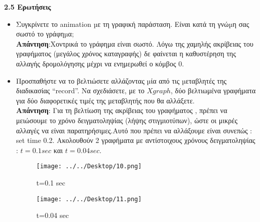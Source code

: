 \documentclass{article}%
\begin{document}
\textbf{2.5 Ερωτήσεις } \\
\begin{itemize}
	\item Συγκρίνετε το \textlatin{animation} µε τη γραφική παράσταση. Είναι κατά τη γνώµη σας σωστό το γράφηµα;\\
	\textbf{Απάντηση}:Χοντρικά το γράφημα είναι σωστό. Λόγω της χαμηλής ακρίβειας του γραφήματος (μεγάλος χρόνος καταγραφής) δε φαίνεται η καθυστέρηση της αλλαγής δρομολόγησης μέχρι να ενημερωθεί ο κόμβος 0.\\
	\item Προσπαθήστε να το βελτιώσετε αλλάζοντας µία από τις µεταβλητές της διαδικασίας “\textlatin{record}”. Να
σχεδιάσετε, με το $Xgraph$, δύο βελτιωμένα γραφήματα για δύο διαφορετικές τιμές της μεταβλητής
που θα αλλάξετε. \\
	\textbf{Απάντηση}:	Για τη βελτίωση της ακρίβειας του γραφήματος , πρέπει να μειώσουμε το χρόνο δειγματοληψίας (λήψης στιγμιοτύπων), ώστε οι μικρές αλλαγές να είναι παρατηρήσιμες.Αυτό που πρέπει να αλλάξουμε είναι συνεπώς :
	\textlatin{set time 0.2}. Ακολουθούν 2 γραφήματα με αντίστοιχους χρόνους δειγματοληψίας : $t=0.1 sec$ και $t=0.04 sec$. 

\begin{figure}[htbp]
\centering
\begin{minipage}{0.45\textwidth}
\centering
\texttt{[image: ../../Desktop/10.png]}
\caption{t=0.1 sec}
\end{minipage}\hfill
\begin{minipage}{0.45\textwidth}
\centering
\texttt{[image: ../../Desktop/11.png]}
\caption{t=0.04 sec}
\end{minipage}
\end{figure}



\end{itemize}
\end{document}

